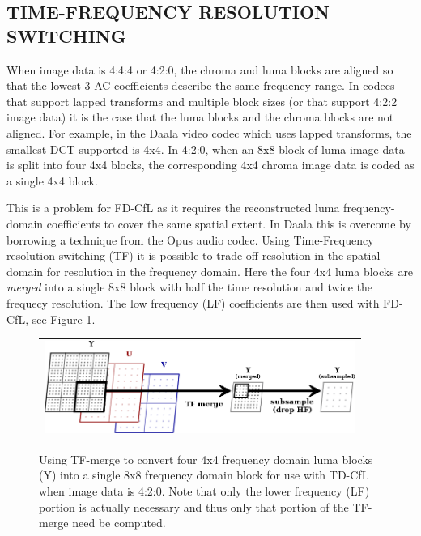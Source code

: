 \documentclass[a4paper]{spie}  %
\begin{document}
\subsection{TIME-FREQUENCY RESOLUTION SWITCHING}

When image data is 4:4:4 or 4:2:0, the chroma and luma blocks are aligned so
 that the lowest 3 AC coefficients describe the same frequency range.
In codecs that support lapped transforms and multiple block sizes (or that
 support 4:2:2 image data) it is the case that the luma blocks and the chroma
 blocks are not aligned.
For example, in the Daala video codec which uses lapped transforms, the
 smallest DCT supported is 4x4.
In 4:2:0, when an 8x8 block of luma image data is split into four 4x4 blocks,
 the corresponding 4x4 chroma image data is coded as a single 4x4 block.

This is a problem for FD-CfL as it requires the reconstructed luma
 frequency-domain coefficients to cover the same spatial extent.
In Daala this is overcome by borrowing a technique from the Opus audio
 codec\cite{valin2013high}.
Using Time-Frequency resolution switching (TF) it is possible to trade off
 resolution in the spatial domain for resolution in the frequency domain.
Here the four 4x4 luma blocks are {\em merged} into a single 8x8 block with
 half the time resolution and twice the frequecy resolution.
The low frequency (LF) coefficients are then used with FD-CfL, see
 Figure \ref{fig:tf}.

\begin{figure}[h]
\begin{center}
\begin{tabular}{c}
\includegraphics[natwidth=799,natheight=237,width=4in]{CfL-TF.png}
\end{tabular}
\end{center}
\caption[example]{\label{fig:tf} Using TF-merge to convert four 4x4 frequency
 domain luma blocks (Y) into a single 8x8 frequency domain block for use with
 TD-CfL when image data is 4:2:0.  Note that only the lower frequency (LF)
 portion is actually necessary and thus only that portion of the TF-merge need
 be computed.}
\end{figure}
\end{document}
